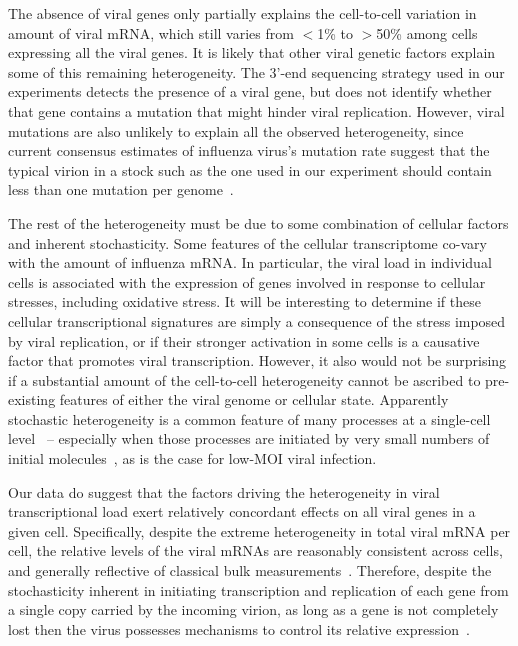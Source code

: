 \documentclass[9pt,lineno]{elife}
\begin{document}
The absence of viral genes only partially explains the cell-to-cell variation in amount of viral mRNA, which still varies from $<$1\% to $>$50\% among cells expressing all the viral genes.
It is likely that other viral genetic factors explain some of this remaining heterogeneity.
The 3'-end sequencing strategy used in our experiments detects the presence of a viral gene, but does not identify whether that gene contains a mutation that might hinder viral replication.
However, viral mutations are also unlikely to explain all the observed heterogeneity, since current consensus estimates of influenza virus's mutation rate suggest that the typical virion in a stock such as the one used in our experiment should contain less than one mutation per genome~\citep{parvin1986measurement,suarez1992heterogeneity,suarez1994estimation,nobusawa2006comparison,bloom2014experimentally,pauly2017novel}.

The rest of the heterogeneity must be due to some combination of cellular factors and inherent stochasticity.
Some features of the cellular transcriptome co-vary with the amount of influenza mRNA. 
In particular, the viral load in individual cells is associated with the expression of genes involved in response to cellular stresses, including oxidative stress.
It will be interesting to determine if these cellular transcriptional signatures are simply a consequence of the stress imposed by viral replication, or if their stronger activation in some cells is a causative factor that promotes viral transcription.
However, it also would not be surprising if a substantial amount of the cell-to-cell heterogeneity cannot be ascribed to pre-existing features of either the viral genome or cellular state. 
Apparently stochastic heterogeneity is a common feature of many processes at a single-cell level~\citep{cai2006stochastic,raj2006stochastic,buganim2012single,shalek2013single,avraham2015pathogen} -- especially when those processes are initiated by very small numbers of initial molecules~\citep{elowitz2002stochastic}, as is the case for low-MOI viral infection.

Our data do suggest that the factors driving the heterogeneity in viral transcriptional load exert relatively concordant effects on all viral genes in a given cell.
Specifically, despite the extreme heterogeneity in total viral mRNA per cell, the relative levels of the viral mRNAs are reasonably consistent across cells, and generally reflective of classical bulk measurements~\citep{hatada1989control}.
Therefore, despite the stochasticity inherent in initiating transcription and replication of each gene from a single copy carried by the incoming virion, as long as a gene is not completely lost then the virus possesses mechanisms to control its relative expression~\citep{Shapiro:1987ur,hatada1989control,perez2010influenza,heldt2012modeling,chua2013influenza}.
\end{document}
